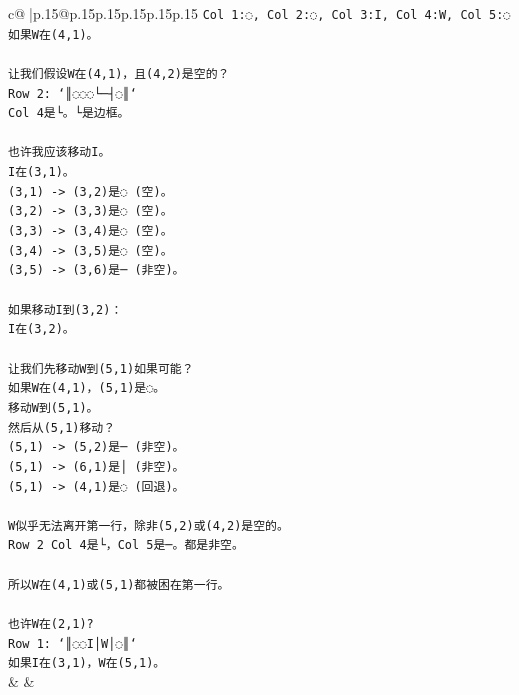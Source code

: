 \documentclass{article}
\begin{document}
{\begin{supertabular}{c@{$\;$}|p{.15\linewidth}@{}p{.15\linewidth}p{.15\linewidth}p{.15\linewidth}p{.15\linewidth}p{.15\linewidth}}
{{{\texttt{Col 1:◌, Col 2:◌, Col 3:I, Col 4:W, Col 5:◌} \\
\texttt{如果W在(4,1)。} \\
\\ 
\texttt{让我们假设W在(4,1)，且(4,2)是空的？} \\
\texttt{Row 2: `║◌◌◌└─┤◌║`} \\
\texttt{Col 4是└。└是边框。} \\
\\ 
\texttt{也许我应该移动I。} \\
\texttt{I在(3,1)。} \\
\texttt{(3,1) {-}> (3,2)是◌ (空)。} \\
\texttt{(3,2) {-}> (3,3)是◌ (空)。} \\
\texttt{(3,3) {-}> (3,4)是◌ (空)。} \\
\texttt{(3,4) {-}> (3,5)是◌ (空)。} \\
\texttt{(3,5) {-}> (3,6)是─ (非空)。} \\
\\ 
\texttt{如果移动I到(3,2)：} \\
\texttt{I在(3,2)。} \\
\\ 
\texttt{让我们先移动W到(5,1)如果可能？} \\
\texttt{如果W在(4,1)，(5,1)是◌。} \\
\texttt{移动W到(5,1)。} \\
\texttt{然后从(5,1)移动？} \\
\texttt{(5,1) {-}> (5,2)是─ (非空)。} \\
\texttt{(5,1) {-}> (6,1)是│ (非空)。} \\
\texttt{(5,1) {-}> (4,1)是◌ (回退)。} \\
\\ 
\texttt{W似乎无法离开第一行，除非(5,2)或(4,2)是空的。} \\
\texttt{Row 2 Col 4是└，Col 5是─。都是非空。} \\
\\ 
\texttt{所以W在(4,1)或(5,1)都被困在第一行。} \\
\\ 
\texttt{也许W在(2,1)?} \\
\texttt{Row 1: `║◌◌I│W│◌║`} \\
\texttt{如果I在(3,1)，W在(5,1)。} \\
            }
        }
    }
    & & \\ \\


\end{supertabular}}
\end{document}
